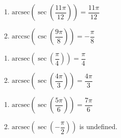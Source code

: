 \begin{multicols}{2}

\begin{enumerate}

\setcounter{enumi}{\value{HW}}

\item  $\text{arcsec}\left(\sec\left(\dfrac{11\pi}{12}\right) \right) = \dfrac{11\pi}{12}$
\item  $\text{arccsc}\left(\csc\left(\dfrac{9\pi}{8}\right) \right) = -\dfrac{\pi}{8}$ 

\setcounter{HW}{\value{enumi}}

\end{enumerate}

\end{multicols}



\begin{multicols}{2}

\begin{enumerate}

\setcounter{enumi}{\value{HW}}

\item  $\text{arcsec}\left(\sec\left(\dfrac{\pi}{4}\right) \right) = \dfrac{\pi}{4}$ 
\item  $\text{arcsec}\left(\sec\left(\dfrac{4\pi}{3}\right) \right) = \dfrac{4\pi}{3}$

\setcounter{HW}{\value{enumi}}

\end{enumerate}

\end{multicols}

\begin{multicols}{2}

\begin{enumerate}

\setcounter{enumi}{\value{HW}}

\item  $\text{arcsec}\left(\sec\left( \dfrac{5\pi}{6} \right) \right) = \dfrac{7\pi}{6}$
\item  $\text{arcsec}\left(\sec\left(-\dfrac{\pi}{2} \right) \right)$ is undefined. 

\setcounter{HW}{\value{enumi}}

\end{enumerate}

\end{multicols}

